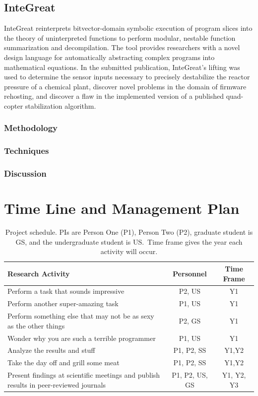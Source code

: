 \subsection{InteGreat}

InteGreat reinterprets bitvector-domain symbolic execution of program slices into the theory of uninterpreted functions to perform modular, nestable function summarization and decompilation.
The tool provides researchers with a novel design language for automatically abstracting complex programs into mathematical equations.
In the submitted publication, InteGreat's lifting was used to determine the sensor inputs necessary to precisely destabilize the reactor pressure of a chemical plant, discover novel problems in the domain of firmware rehosting, and discover a flaw in the implemented version of a published quad-copter stabilization algorithm.

\subsubsection{Methodology}
\subsubsection{Techniques}
\subsubsection{Discussion}

\section{Time Line and Management Plan}

\begin{table}[H]
\label{table1}
\renewcommand{\arraystretch}{0}
\caption{Project schedule.  PIs are Person One (P1), Person Two (P2), graduate student is GS, and the undergraduate student is US.\ Time frame gives the year each activity will occur.}
\scriptsize
\begin{tabularx}{\textwidth}{Y c c }
\hline
\hline
\textbf{Research Activity} & \textbf{Personnel} & \textbf{Time Frame}\\
\hline
Perform a task that sounds impressive & P2, US & Y1 \T\\
Perform another super-amazing task & P1, US & Y1 \T\\
Perform something else that may not be as sexy as the other things & P2, GS & Y1 \T\\
Wonder why you are such a terrible programmer & P1, US & Y1 \T\\
Analyze the results and stuff & P1, P2, SS & Y1,Y2 \T\\
Take the day off and grill some meat & P1, P2, SS & Y1,Y2 \T\\
Present findings at scientific meetings and publish results in peer-reviewed journals & P1, P2, US, GS & Y1, Y2, Y3\T\B\\
\hline
\hline
\end{tabularx}
\end{table}

